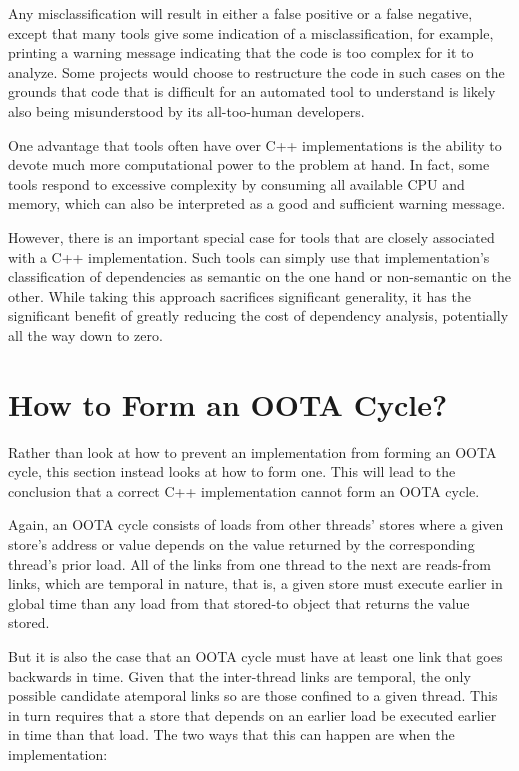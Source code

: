 \documentclass[10]{article}
\begin{document}
Any misclassification will result in either a false positive or
a false negative, except that many tools give some indication of a
misclassification, for example, printing a warning message indicating
that the code is too complex for it to analyze.
Some projects would choose to restructure the code in such cases on the
grounds that code that is difficult for an automated tool to understand
is likely also being misunderstood by its all-too-human developers.

One advantage that tools often have over C++ implementations is the
ability to devote much more computational power to the problem at hand.
In fact, some tools respond to excessive complexity by consuming all
available CPU and memory, which can also be interpreted as a good and
sufficient warning message.

However, there is an important special case for tools that are closely
associated with a C++ implementation.
Such tools can simply use that implementation's classification of
dependencies as semantic on the one hand or non-semantic on the other.
While taking this approach sacrifices significant generality, it has the
significant benefit of greatly reducing the cost of dependency analysis,
potentially all the way down to zero.

\section{How to Form an OOTA Cycle?}
\label{sec:How to Form an OOTA Cycle?}

Rather than look at how to prevent an implementation from forming
an OOTA cycle, this section instead looks at how to form one.
This will lead to the conclusion that a correct C++ implementation
cannot form an OOTA cycle.

Again, an OOTA cycle consists of loads from other threads' stores where
a given store's address or value depends on the value returned by
the corresponding thread's prior load.
All of the links from one thread to the next are reads-from links, which
are temporal in nature, that is, a given store must execute earlier in
global time than any load from that stored-to object that returns the
value stored.

But it is also the case that an OOTA cycle must have at least one link
that goes backwards in time.
Given that the inter-thread links are temporal, the only possible
candidate atemporal links so are those confined to a given thread.
This in turn requires that a store that depends on an earlier load
be executed earlier in time than that load.
The two ways that this can happen are when the implementation:
\end{document}

